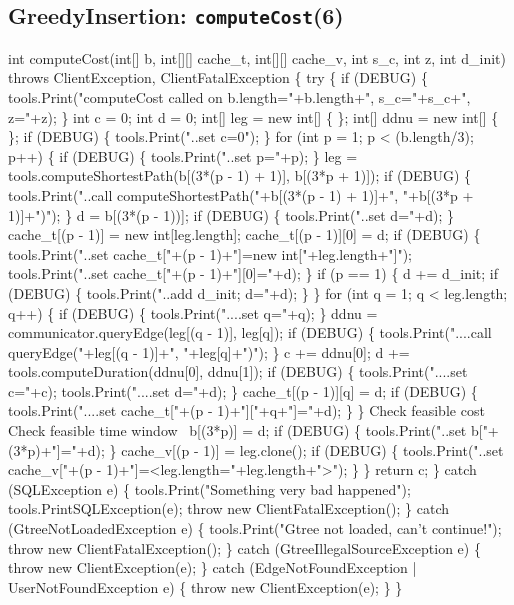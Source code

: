 \subsection{GreedyInsertion: \texttt{computeCost}(6)}
\nwenddocs{}\endmoddef\nwstartdeflinemarkup{}\nwenddeflinemarkup
int computeCost(int[] b, int[][] cache_t, int[][] cache_v, int s_c, int z, int d_init)
throws ClientException, ClientFatalException \{
  try \{
    if (DEBUG) \{
      tools.Print("computeCost called on b.length="+b.length+", s_c="+s_c+", z="+z);
    \}
    int c = 0;
    int d = 0;
    int[] leg = new int[] \{ \};
    int[] ddnu = new int[] \{ \};
    if (DEBUG) \{
      tools.Print("..set c=0");
    \}
    for (int p = 1; p < (b.length/3); p++) \{
      if (DEBUG) \{
        tools.Print("..set p="+p);
      \}
      leg = tools.computeShortestPath(b[(3*(p - 1) + 1)], b[(3*p + 1)]);
      if (DEBUG) \{
        tools.Print("..call computeShortestPath("+b[(3*(p - 1) + 1)]+", "+b[(3*p + 1)]+")");
      \}
      d = b[(3*(p - 1))];
      if (DEBUG) \{
        tools.Print("..set d="+d);
      \}
      cache_t[(p - 1)] = new int[leg.length];
      cache_t[(p - 1)][0] = d;
      if (DEBUG) \{
        tools.Print("..set cache_t["+(p - 1)+"]=new int["+leg.length+"]");
        tools.Print("..set cache_t["+(p - 1)+"][0]="+d);
      \}
      if (p == 1) \{
        d += d_init;
        if (DEBUG) \{
          tools.Print("..add d_init; d="+d);
        \}
      \}
      for (int q = 1; q < leg.length; q++) \{
        if (DEBUG) \{
          tools.Print("....set q="+q);
        \}
        ddnu = communicator.queryEdge(leg[(q - 1)], leg[q]);
        if (DEBUG) \{
          tools.Print("....call queryEdge("+leg[(q - 1)]+", "+leg[q]+")");
        \}
        c += ddnu[0];
        d += tools.computeDuration(ddnu[0], ddnu[1]);
        if (DEBUG) \{
          tools.Print("....set c="+c);
          tools.Print("....set d="+d);
        \}
        cache_t[(p - 1)][q] = d;
        if (DEBUG) \{
          tools.Print("....set cache_t["+(p - 1)+"]["+q+"]="+d);
        \}
      \}
      \LA{}Check feasible cost~{\nwtagstyle{}}\RA{}
      \LA{}Check feasible time window~{\nwtagstyle{}}\RA{}
      b[(3*p)] = d;
      if (DEBUG) \{
        tools.Print("..set b["+(3*p)+"]="+d);
      \}
      cache_v[(p - 1)] = leg.clone();
      if (DEBUG) \{
        tools.Print("..set cache_v["+(p - 1)+"]=<leg.length="+leg.length+">");
      \}
    \}
    return c;
  \} catch (SQLException e) \{
    tools.Print("Something very bad happened");
    tools.PrintSQLException(e);
    throw new ClientFatalException();
  \} catch (GtreeNotLoadedException e) \{
    tools.Print("Gtree not loaded, can't continue!");
    throw new ClientFatalException();
  \} catch (GtreeIllegalSourceException e) \{
    throw new ClientException(e);
  \} catch (EdgeNotFoundException | UserNotFoundException e) \{
    throw new ClientException(e);
  \}
\}
\nwendcode{}\nwdocspar

